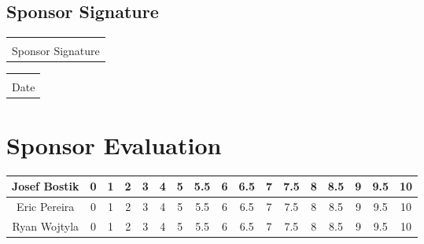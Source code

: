 \documentclass[12pt]{article}
\makeatletter
\newcommand{\titledate}[2][2.5in]{%
	\noindent%
	\begin{tabular}{@{}p{#1}@{}}
		\\ \hline \\[-.75\normalbaselineskip]
		#2
	\end{tabular} \hspace{1in}
	\begin{tabular}{@{}p{#1}@{}}
		\\ \hline \\[-.75\normalbaselineskip]
		Date
	\end{tabular}
}
\makeatother
\begin{document}
\subsection{Sponsor Signature}
\vspace{.5in}
 \titledate{Sponsor Signature}
 
\section{Sponsor Evaluation}
\begin{tabular}{|c|c|c|c|c|c|c|c|c|c|c|c|c|c|c|c|c|}
	\hline
	Josef Bostik & 0 & 1 & 2 & 3 & 4 & 5 & 5.5 & 6 & 6.5 & 7 & 7.5 & 8 & 8.5 & 9 & 9.5 & 10\\
	\hline
	Eric Pereira & 0 & 1 & 2 & 3 & 4 & 5 & 5.5 & 6 & 6.5 & 7 & 7.5 & 8 & 8.5 & 9 & 9.5 & 10\\
	\hline
	Ryan Wojtyla & 0 & 1 & 2 & 3 & 4 & 5 & 5.5 & 6 & 6.5 & 7 & 7.5 & 8 & 8.5 & 9 & 9.5 & 10\\
	\hline
\end{tabular}
\end{document}
